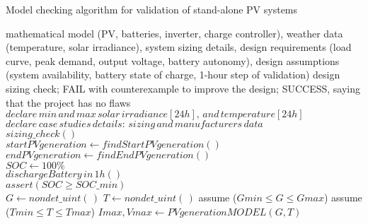 \begin{algorithm}
 \caption{Model checking algorithm for validation of stand-alone PV systems}
 \begin{algorithmic}[1]
 \renewcommand{\algorithmicrequire}{\textbf{Input:}}
 \renewcommand{\algorithmicensure}{\textbf{Output:}}
 \REQUIRE mathematical model (PV, batteries, inverter, charge controller), weather data (temperature, solar irradiance), system sizing details, design requirements (load curve, peak demand, output voltage, battery autonomy), design assumptions (system availability, battery state of charge, 1-hour step of validation)
 \ENSURE design sizing check; FAIL with counterexample to improve the design; SUCCESS, saying that the project has no flaws
  \STATE $declare \, min \, and \, max \, solar \, irradiance[24h], \, and \, temperature[24h]$\\
  \STATE $declare \, case \, studies \, details: \, sizing \, and \, manufacturers \, data $ \\
  \STATE $sizing \_ check()$ \\
  \STATE $startPVgeneration \leftarrow findStartPVgeneration()$ \\
  \STATE $endPVgeneration \leftarrow findEndPVgeneration()$ \\
  \STATE $SOC \leftarrow 100\%$ \\
	  \STATE $dischargeBattery \, in \, 1h()$ \\
	  \STATE $assert (SOC \geq SOC \_ min)$ \\
  \ENDFOR
    \STATE $G \leftarrow nondet \_ uint(\,)$ 
    \STATE $T \leftarrow nondet \_ uint(\,)$ 
    \STATE assume ($Gmin \leq G \leq Gmax$) 
    \STATE assume ($Tmin \leq T \leq Tmax$) 
    \STATE $Imax, Vmax \leftarrow PVgenerationMODEL (G,T)$ \\

\end{algorithmic}
\end{algorithm}
